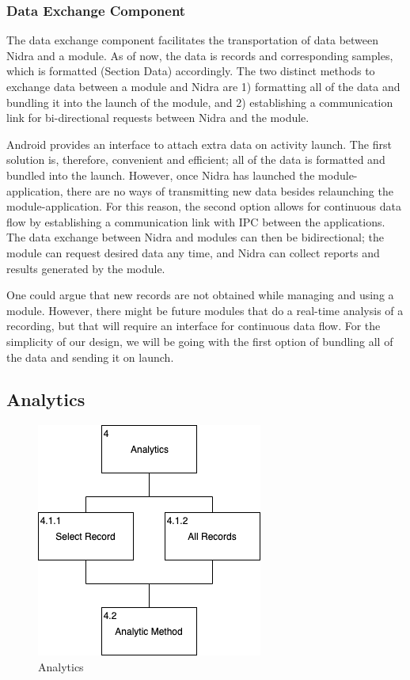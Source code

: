 \subsubsection{Data Exchange Component}

The data exchange component facilitates the transportation of data between Nidra and a module. As of now, the data is records and corresponding samples, which is formatted (Section Data) accordingly. The two distinct methods to exchange data between a module and Nidra are 1) formatting all of the data and bundling it into the launch of the module, and 2) establishing a communication link for bi-directional requests between Nidra and the module. 

Android provides an interface to attach extra data on activity launch. The first solution is, therefore, convenient and efficient; all of the data is formatted and bundled into the launch. However, once Nidra has launched the module-application, there are no ways of transmitting new data besides relaunching the module-application. For this reason, the second option allows for continuous data flow by establishing a communication link with IPC between the applications. The data exchange between Nidra and modules can then be bidirectional; the module can request desired data any time, and Nidra can collect reports and results generated by the module. 

One could argue that new records are not obtained while managing and using a module. However, there might be future modules that do a real-time analysis of a recording, but that will require an interface for continuous data flow. For the simplicity of our design, we will be going with the first option of bundling all of the data and sending it on launch.

\subsection{Analytics}

\begin{figure}
    \centering
    \includegraphics[scale=0.6]{images/Analytics.png}
    \caption{Analytics}
    \label{fig:hta_analytics}
\end{figure}

